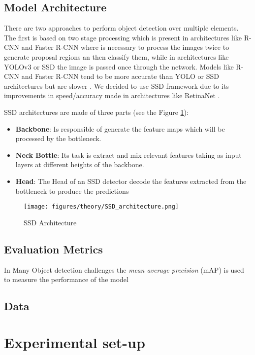 \documentclass{IEEEtran}
\begin{document}
\subsection{Model Architecture}
There are two approaches to perform object detection over multiple elements. The
first is based on two stage processing which is present in architectures like
R-CNN \cite{detectors:R-CNN} and Faster R-CNN \cite{detectors:Faster_R-CNN}
where is necessary to process the images twice to generate proposal regions an
then classify them, while in architectures like YOLOv3 \cite{detectors:yolov3}
or SSD \cite{detectors:SSD} the image is passed once through the network. Models
like R-CNN and Faster R-CNN tend to be more accurate than YOLO or SSD
architectures but are slower \cite{detectors:comparison}. We decided to use SSD
framework due to its improvements in speed/accuracy made in architectures like
RetinaNet \cite{detectors:retinanet}.\par

SSD architectures are made of three parts (see the Figure
\ref{fig:SSD_architecture}):
\begin{itemize}
    \item \textbf{Backbone}: Is responsible of generate the feature maps which
          will be processed by the bottleneck.
    \item \textbf{Neck Bottle}: Its task is extract and mix relevant features
        taking as input layers at different heights of the backbone.
    \item \textbf{Head}: The Head of an SSD detector decode the features
        extracted from the bottleneck to produce the predictions
\end{itemize}

\begin{figure}[h]
    \centering
    \texttt{[image: figures/theory/SSD\_architecture.png]}
    \label{fig:SSD_architecture}
    \caption{SSD Architecture}
\end{figure}

\subsection{Evaluation Metrics}
In Many Object detection challenges the \emph{mean average precision} (mAP) is
used to measure the performance of the model

\subsection{Data}

\section{Experimental set-up}
\printbibliography
\end{document}
